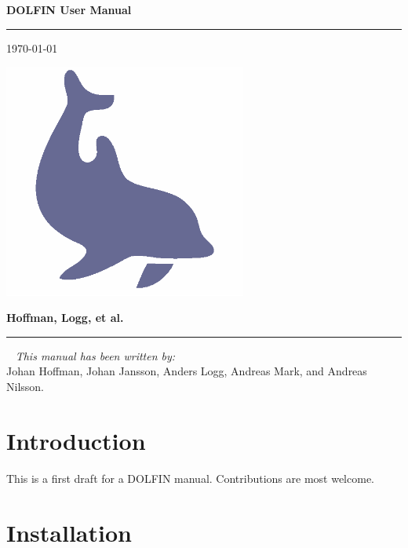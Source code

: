 \documentclass[12pt]{article}
\begin{document}

\thispagestyle{empty}

\Large
\textbf{DOLFIN User Manual} \\
\vspace{-0.5cm}
\hrule
\hfill
\small
\today

\vspace{3cm}

\begin{center}
  \includegraphics[width=8cm]{eps/dolfin.eps}
\end{center}

\vfill

\normalsize
\textbf{Hoffman, Logg, et al.}
\hrule

\newpage


\ 
\vfill
\emph{This manual has been written by:} \\
Johan Hoffman, Johan Jansson, Anders Logg, Andreas Mark, and Andreas Nilsson.
\thispagestyle{empty}

\cleardoublepage


\tableofcontents
\newpage

\cleardoublepage
\section{Introduction}

This is a first draft for a DOLFIN manual. Contributions are most welcome.

\cleardoublepage
\section{Installation}
\end{document}
